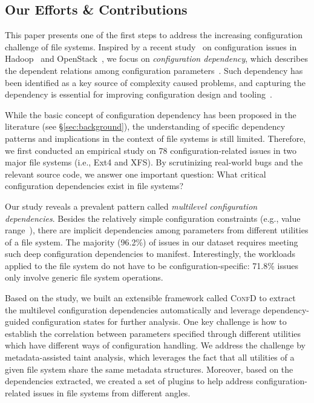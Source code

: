\subsection{Our Efforts \& Contributions}
This paper presents one of the first steps to address the increasing configuration challenge of file systems. Inspired by a recent study~\cite{cdep} on configuration issues in Hadoop~\cite{Hadoop} and OpenStack~\cite{OpenStack}, we focus on \textit{configuration dependency}, which describes the dependent relations among configuration parameters~\cite{cdep}. Such dependency has been identified as a key source of  complexity caused problems, and capturing the dependency is essential for improving  configuration design and tooling~\cite{cdep,TianyinXu-AnHCIViewofConfigurationProblemsArXiv16,spex}.

While the basic concept of configuration dependency  
has been proposed in the literature (see \S\ref{sec:background}),
the understanding of specific dependency patterns and  implications  in the context of  file  systems is still limited. 
Therefore, we first conducted an empirical study on 78 configuration-related issues in two major file systems (i.e., Ext4 and XFS).
By scrutinizing   real-world   bugs and the relevant source code, 
we answer one important question: What critical configuration dependencies exist in file systems? 

Our study reveals a prevalent pattern called \textit{multilevel configuration dependencies}.
Besides the relatively simple configuration constraints (e.g., value range~\cite{spex}),
there are implicit dependencies among parameters from different utilities of a file system.
The majority  (96.2\%) of  issues in our dataset requires meeting 
such deep configuration dependencies to manifest.
Interestingly, the  workloads applied to the file system do not have to be configuration-specific: 
71.8\% issues only involve generic file system operations. 

Based on the study, we built an extensible framework called \textsc{ConfD} to extract the multilevel configuration dependencies automatically and leverage dependency-guided   configuration states for further analysis. 
One key challenge is how to establish the correlation between parameters specified through different utilities which have different ways of  configuration handling.
We address the challenge by metadata-assisted taint analysis, which leverages the fact that all utilities of a given file system share the same  metadata structures.  
Moreover, based on the   dependencies extracted,  we created a set of plugins to help address  configuration-related issues in file systems from different angles.


